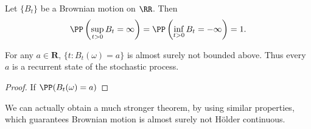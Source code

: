 \begin{corollary}
    Let $\{ B_t \}$ be a Brownian motion on $\RR$. Then
    \[ \PP \left( \sup_{t > 0} B_t = \infty \right) = \PP \left( \inf_{t > 0} B_t = -\infty \right) = 1. \]
\end{corollary}


\begin{corollary}
    For any $a \in \mathbf{R}$, $\{ t: B_t(\omega) = a \}$ is almost surely not bounded above. Thus every $a$ is a recurrent state of the stochastic process.
\end{corollary}
\begin{proof}
    

    If $\PP(B_t(\omega) = a)$
\end{proof}

We can actually obtain a much stronger theorem, by using similar properties, which guarantees Brownian motion is almost surely not H\"{o}lder continuous.

